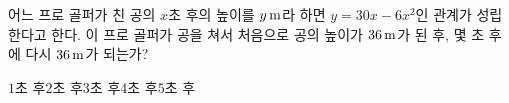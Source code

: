 어느 프로 골퍼가 친 공의 $x$초 후의 높이를 $y\mkern3mu \mathrm{m}$라 하면 $y=30x-6x^2$인 관계가 성립한다고 한다. 이 프로 골퍼가 공을 쳐서 처음으로 공의 높이가 $36\mkern3mu \mathrm{m}$가 된 후, 몇 초 후에 다시 $36\mkern3mu \mathrm{m}$가 되는가?
\begin{choices32}{$1$초 후}{$2$초 후}{$3$초 후}{$4$초 후}{$5$초 후}\end{choices32}
